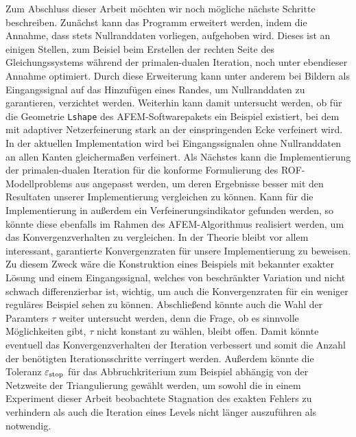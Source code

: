 Zum Abschluss dieser Arbeit möchten wir noch mögliche nächste Schritte
beschreiben.
Zunächst kann das Programm erweitert werden, indem die Annahme, dass
stets Nullranddaten vorliegen, aufgehoben wird. 
Dieses ist an einigen Stellen, zum Beisiel beim Erstellen der rechten Seite des 
Gleichungssystems während der primalen-dualen Iteration, noch unter ebendieser
Annahme optimiert.
Durch diese Erweiterung kann unter anderem bei Bildern als Eingangssignal auf
das Hinzufügen eines Randes, um Nullranddaten zu garantieren, verzichtet
werden.
Weiterhin kann damit untersucht werden, ob für die Geometrie \texttt{Lshape}
des AFEM-Softwarepakets ein Beispiel existiert, bei 
dem mit adaptiver Netzerfeinerung stark an der einspringenden Ecke verfeinert 
wird. 
In der aktuellen Implementation wird bei Eingangssignalen ohne Nullranddaten
an allen Kanten gleichermaßen verfeinert.
Als Nächstes kann die Implementierung der primalen-dualen Iteration für die
konforme Formulierung des ROF-Modellproblems aus \cite{Bar15} angepasst werden,
um deren Ergebnisse besser mit den Resultaten unserer Implementierung 
vergleichen zu können.
Kann für die Implementierung in \cite{Bar15} außerdem ein
Verfeinerungsindikator gefunden werden, so könnte diese ebenfalls im Rahmen des
AFEM-Algorithmus realisiert werden, um das Konvergenzverhalten zu vergleichen.
In der Theorie bleibt vor allem interessant, garantierte Konvergenzraten für
unsere Implementierung zu beweisen.
Zu diesem Zweck wäre die Konstruktion eines Beispiels mit bekannter
exakter Lösung und einem Eingangssignal, welches von beschränkter Variation und
nicht schwach differenzierbar ist, wichtig, um auch die Konvergenzraten
für ein weniger reguläres Beispiel sehen zu können.
Abschließend könnte auch die Wahl der Paramters $\tau$ weiter untersucht
werden, denn die Frage, ob es sinnvolle Möglichkeiten gibt, $\tau$ nicht
konstant zu wählen, bleibt offen.
Damit könnte eventuell das Konvergenzverhalten der Iteration verbessert und
somit die Anzahl der benötigten Iterationsschritte verringert werden.  Außerdem
könnte die Toleranz $\varepsilon_{\textup{stop}}$ für das Abbruchkriterium zum Beispiel abhängig
von der Netzweite der Triangulierung gewählt werden, um sowohl die in einem
Experiment dieser Arbeit beobachtete Stagnation des exakten Fehlers zu
verhindern als auch die Iteration eines Levels nicht länger auszuführen als
notwendig.
